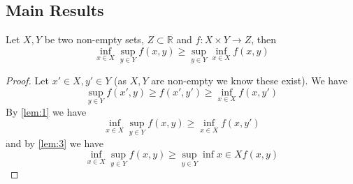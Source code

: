 \documentclass{article}
\begin{document}
\subsection{Main Results}

\begin{theorem}
  Let $X, Y$ be two non-empty sets, $Z \subset \mathbb{R}$ and $f : X \times Y \to Z$, then
  $$
    \inf_{x \in X} \sup_{y \in Y} f(x, y) \ge \sup_{y \in Y} \inf_{x \in X} f(x, y)
  $$
\end{theorem}
\begin{proof}
  Let $x' \in X, y' \in Y$ (as $X, Y$ are non-empty we know these exist). We have
  $$
    \sup_{y \in Y} f(x', y) \ge f(x', y') \ge \inf_{x \in X} f(x, y')
  $$
  By \cref{lem:1} we have
  $$
    \inf_{x \in X} \sup_{y \in Y} f(x, y) \ge \inf_{x \in X} f(x, y')
  $$
  and by \cref{lem:3} we have
  $$
    \inf_{x \in X} \sup_{y \in Y} f(x, y) \ge \sup_{y \in Y} \inf{x \in X} f(x, y)
  $$
\end{proof}
\end{document}
